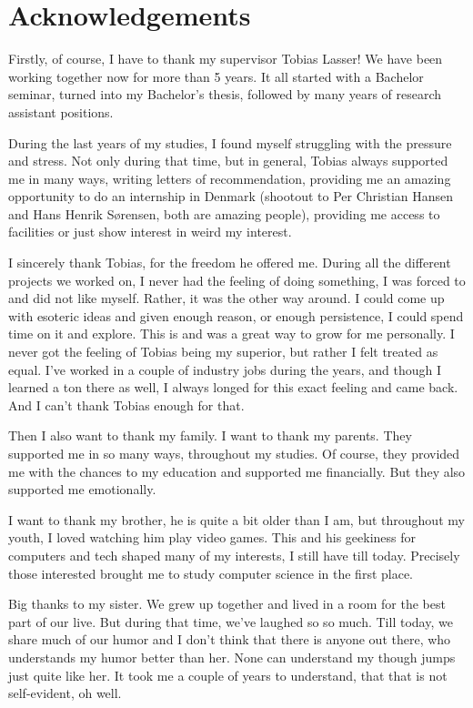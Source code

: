 \thispagestyle{empty}
\chapter*{Acknowledgements}
\noindent%

Firstly, of course, I have to thank my supervisor Tobias Lasser! We have been working together now
for more than 5 years. It all started with a Bachelor seminar, turned into my Bachelor's thesis,
followed by many years of research assistant positions.

During the last years of my studies, I found myself struggling with the pressure and stress. Not
only during that time, but in general, Tobias always supported me in many ways, writing letters of
recommendation, providing me an amazing opportunity to do an internship in Denmark (shootout to Per
Christian Hansen and Hans Henrik Sørensen, both are amazing people), providing me access to
facilities or just show interest in weird my interest.

I sincerely thank Tobias, for the freedom he offered me. During all the different projects we worked
on, I never had the feeling of doing something, I was forced to and did not like myself. Rather, it
was the other way around. I could come up with esoteric ideas and given enough reason, or enough
persistence, I could spend time on it and explore. This is and was a great way to grow for me
personally. I never got the feeling of Tobias being my superior, but rather I felt treated as equal.
I've worked in a couple of industry jobs during the years, and though I learned a ton there as well,
I always longed for this exact feeling and came back. And I can't thank Tobias enough for that.

Then I also want to thank my family. I want to thank my parents. They supported me in so many ways,
throughout my studies. Of course, they provided me with the chances to my education and supported me
financially. But they also supported me emotionally.

I want to thank my brother, he is quite a bit older than I am, but throughout my youth, I loved
watching him play video games. This and his geekiness for computers and tech shaped many of my
interests, I still have till today. Precisely those interested brought me to study computer science
in the first place.

Big thanks to my sister. We grew up together and lived in a room for the best part of our live. But
during that time, we've laughed so so much. Till today, we share much of our humor and I don't think
that there is anyone out there, who understands my humor better than her. None can understand my
though jumps just quite like her. It took me a couple of years to understand, that that is not
self-evident, oh well.

